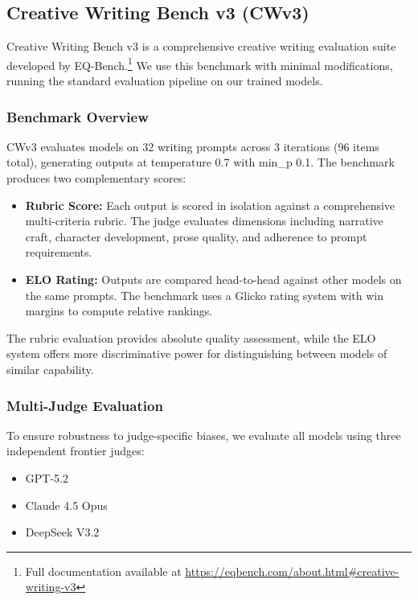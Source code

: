 \documentclass{article}
\theoremstyle{plain}
\theoremstyle{definition}
\theoremstyle{remark}
\begin{document}
\subsection{Creative Writing Bench v3 (CWv3)}
\label{app:cwv3}

Creative Writing Bench v3 \citep{paech2024creative} is a comprehensive creative writing evaluation suite developed by EQ-Bench.\footnote{Full documentation available at \url{https://eqbench.com/about.html\#creative-writing-v3}} We use this benchmark with minimal modifications, running the standard evaluation pipeline on our trained models.

\subsubsection{Benchmark Overview}

CWv3 evaluates models on 32 writing prompts across 3 iterations (96 items total), generating outputs at temperature 0.7 with min\_p 0.1. The benchmark produces two complementary scores:

\begin{itemize}
    \item \textbf{Rubric Score:} Each output is scored in isolation against a comprehensive multi-criteria rubric. The judge evaluates dimensions including narrative craft, character development, prose quality, and adherence to prompt requirements.
    \item \textbf{ELO Rating:} Outputs are compared head-to-head against other models on the same prompts. The benchmark uses a Glicko rating system with win margins to compute relative rankings.
\end{itemize}

The rubric evaluation provides absolute quality assessment, while the ELO system offers more discriminative power for distinguishing between models of similar capability.

\subsubsection{Multi-Judge Evaluation}

To ensure robustness to judge-specific biases, we evaluate all models using three independent frontier judges:
\begin{itemize}
    \item GPT-5.2
    \item Claude 4.5 Opus  
    \item DeepSeek V3.2
\end{itemize}
\end{document}

